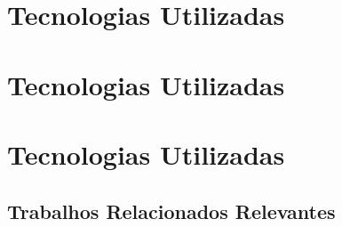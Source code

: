 \documentclass[mestrado, pre-defesa]{packages/icmc}
\begin{document}
% 

\postextual





\glsaddall
\printglossaries


\begin{apendicesenv}

    \chapter{Tecnologias Utilizadas}
    \label{chapter:armazem-de-dados}
    
    
    \chapter{Tecnologias Utilizadas}
    \label{chapter:tecnologias-utilizadas}
    
    
    \chapter{Tecnologias Utilizadas}
    \label{chapter:cfop}
    

\end{apendicesenv}



\begin{anexosenv}

    \chapter{Trabalhos Relacionados Relevantes}
    \label{chapter:trabalhos-relevantes}
    

\end{anexosenv}
\end{document}
